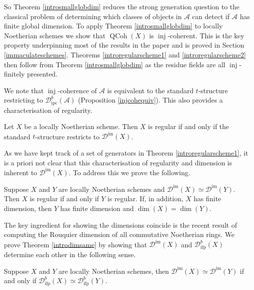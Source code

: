 \documentclass[12pt,oneside]{amsart}
\DeclareMathOperator{\QCoh}{QCoh}
\DeclareMathOperator{\inj}{inj}
\DeclareMathOperator{\immac}{im}
\DeclareMathOperator{\ipscoh}{ipc}
\DeclareMathOperator{\ifp}{ifp}
\begin{document}
So Theorem \ref{introsmallglobdim} reduces the strong generation question to the classical problem of determining which classes of objects in $\mathcal{A}$ can detect if $\mathcal{A}$ has finite global dimension. To apply Theorem \ref{introsmallglobdim} to locally Noetherian schemes we show that $\QCoh(X)$ is $\inj$-coherent. This is the key property underpinning most of the results in the paper and is proved in Section \ref{immaculateschemes}. Theorems \ref{introregularscheme1} and \ref{introregularscheme2} then follow from Theorem \ref{introsmallglobdim} as the residue fields are all $\inj$-finitely presented.


We note that $\inj$-coherence of $\mathcal{A}$ is equivalent to the standard $t$-structure restricting to $\mathcal{D}^b_{\ipscoh}(\mathcal{A})$ (Proposition \ref{injcohequiv}). This also provides a characterisation of regularity. 

\begin{theorem} 
Let $X$ be a locally Noetherian scheme. Then $X$ is regular if and only if the standard $t$-structure restricts to $\mathcal{D}^{\immac}(X)$. 
\end{theorem}

As we have kept track of a set of  generators in Theorem \ref{introregularscheme1}, it is a priori not clear that this characterisation of regularity and dimension is inherent to $\mathcal{D}^{\immac}(X)$. To address this we prove the following.

\begin{theorem} \label{introdimsame} Suppose $X$ and $Y$ are locally Noetherian schemes and $\mathcal{D}^{\immac}(X) \simeq \mathcal{D}^{\immac}(Y)$. Then $X$ is regular if and only if $Y$ is regular. If, in addition, $X$ has finite dimension, then $Y$ has finite dimension and $\dim(X) = \dim(Y)$.
\end{theorem}

The key ingredient for showing the dimensions coincide is the recent result of \cite{Let25} computing the Rouquier dimension of all commutative Noetherian rings.  We prove Theorem \ref{introdimsame} by showing that $\mathcal{D}^{\immac}(X)$ and $\mathcal{D}^b_{\ifp}(X)$ determine each other in the following sense. 

\begin{theorem}
Suppose $X$ and $Y$ are locally Noetherian schemes, then $\mathcal{D}^{\immac}(X) \simeq \mathcal{D}^{\immac}(Y)$ if and only if $\mathcal{D}^b_{\ifp}(X) \simeq \mathcal{D}^{b}_{\ifp}(Y)$.
\end{theorem}
\end{document}

